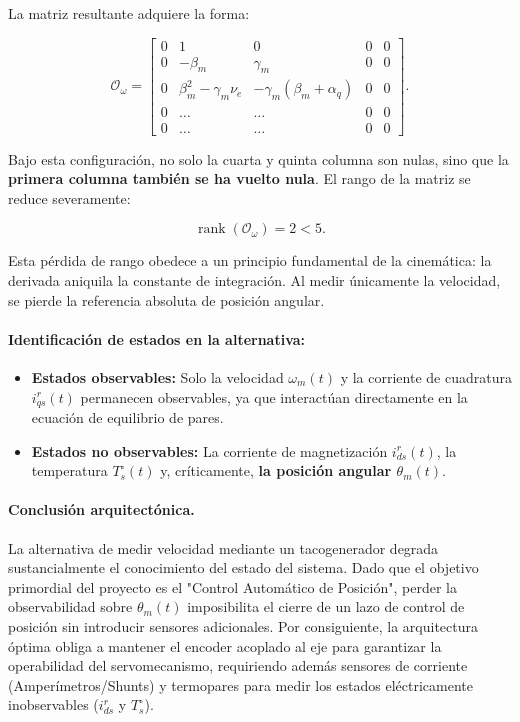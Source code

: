 \documentclass[10pt,a4paper]{article}
\begin{document}
La matriz resultante adquiere la forma:

\begin{equation}
    \mathcal{O}_\omega =
    \begin{bmatrix}
        0 & 1 & 0 & 0 & 0\\[2mm]
        0 & -\beta_m & \gamma_m & 0 & 0\\[2mm]
        0 & \beta_m^2-\gamma_m\nu_e & -\gamma_m(\beta_m+\alpha_q) & 0 & 0\\[2mm]
        0 & \dots & \dots & 0 & 0\\[2mm]
        0 & \dots & \dots & 0 & 0
    \end{bmatrix}.
\end{equation}

Bajo esta configuración, no solo la cuarta y quinta columna son nulas, sino que la \textbf{primera columna también se ha vuelto nula}. El rango de la matriz se reduce severamente:

\begin{equation}
    \operatorname{rank}(\mathcal{O}_\omega) = 2 < 5.
\end{equation}

Esta pérdida de rango obedece a un principio fundamental de la cinemática: la derivada aniquila la constante de integración. Al medir únicamente la velocidad, se pierde la referencia absoluta de posición angular.

\paragraph{Identificación de estados en la alternativa:}
\begin{itemize}
    \item \textbf{Estados observables:} Solo la velocidad $\omega_m(t)$ y la corriente de cuadratura $i_{qs}^r(t)$ permanecen observables, ya que interactúan directamente en la ecuación de equilibrio de pares.
    \item \textbf{Estados no observables:} La corriente de magnetización $i_{ds}^r(t)$, la temperatura $T_s^\circ(t)$ y, críticamente, \textbf{la posición angular $\theta_m(t)$}.
\end{itemize}

\paragraph{Conclusión arquitectónica.} 
La alternativa de medir velocidad mediante un tacogenerador degrada sustancialmente el conocimiento del estado del sistema. Dado que el objetivo primordial del proyecto es el "Control Automático de Posición", perder la observabilidad sobre $\theta_m(t)$ imposibilita el cierre de un lazo de control de posición sin introducir sensores adicionales. Por consiguiente, la arquitectura óptima obliga a mantener el encoder acoplado al eje para garantizar la operabilidad del servomecanismo, requiriendo además sensores de corriente (Amperímetros/Shunts) y termopares para medir los estados eléctricamente inobservables ($i_{ds}^r$ y $T_s^\circ$).
\end{document}
